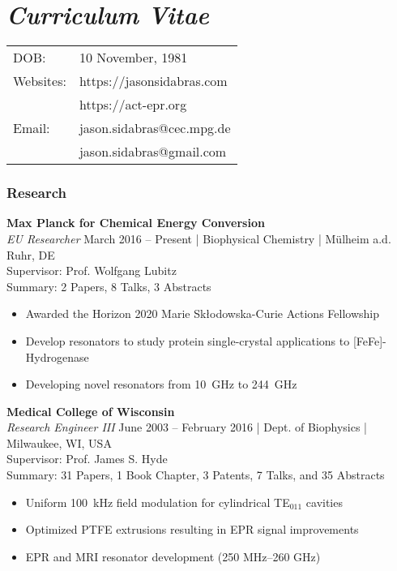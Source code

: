 \chapter[\textit{Curriculum Vitae}.]{\textit{Curriculum Vitae}}
\vspace{1em}

\begin{tabular}{ll}
DOB:        &   10 November, 1981 \\
Websites:   &   https://jasonsidabras.com \\
            &   https://act-epr.org \\
Email:      &   jason.sidabras@cec.mpg.de \\
            &   jason.sidabras@gmail.com
\end{tabular}

\subsection*{Research}
\vspace{-0.5em}
\textbf{Max Planck for Chemical Energy Conversion}\\
\textit{EU Researcher}
\small{March 2016 – Present | Biophysical Chemistry | M{\"u}lheim a.d. Ruhr, DE \\
Supervisor: Prof. Wolfgang Lubitz \\
Summary: 2 Papers, 8 Talks, 3 Abstracts}
\vspace{-0.5em}
\begin{itemize}
\setlength\itemsep{-0.5em}
    \item Awarded the Horizon 2020 Marie Sk\l{}odowska-Curie Actions Fellowship
    \item Develop resonators to study protein single-crystal applications to [FeFe]-Hydrogenase
    \item Developing novel resonators from 10~GHz to 244~GHz
\end{itemize}

\noindent\textbf{Medical College of Wisconsin}\\
\textit{Research Engineer III}
\small{June 2003 – February 2016 | Dept. of Biophysics | Milwaukee, WI, USA \\
Supervisor: Prof. James S. Hyde \\
Summary: 31 Papers, 1 Book Chapter, 3 Patents, 7 Talks, and 35 Abstracts}
\vspace{-0.5em}
\begin{itemize}
\setlength\itemsep{-0.5em}
    \item Uniform 100~kHz field modulation for cylindrical TE$_{011}$ cavities
    \item Optimized PTFE extrusions resulting in EPR signal improvements
    \item EPR and MRI resonator development (250 MHz–260 GHz)
\end{itemize}

